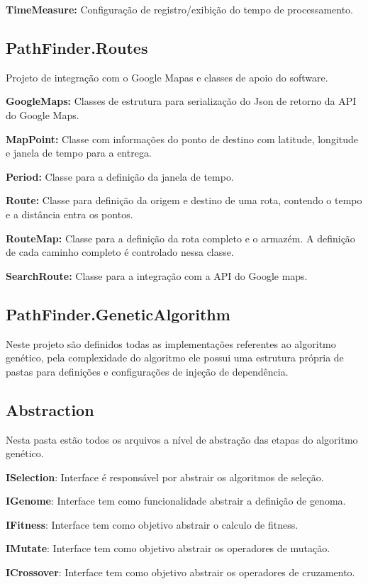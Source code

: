 \textbf{TimeMeasure:} Configuração de registro/exibição do tempo de processamento.
\subsection{PathFinder.Routes}

Projeto de integração com o Google Mapas e classes de apoio do software.

\textbf{GoogleMaps:} Classes de estrutura para serialização do Json de retorno da API do Google Maps.

\textbf{MapPoint:} Classe com informações do ponto de destino com latitude, longitude e janela de tempo para a entrega.

\textbf{Period:} Classe para a definição da janela de tempo.

\textbf{Route:} Classe para definição da origem e destino de uma rota, contendo o tempo e a distância entra os pontos.

\textbf{RouteMap:} Classe para a definição da rota completo e o armazém. A definição de cada caminho completo é controlado nessa classe. 

\textbf{SearchRoute:} Classe para a integração com a API do Google maps.

\subsection{PathFinder.GeneticAlgorithm}
Neste projeto são definidos todas as implementações referentes ao algoritmo genético, pela complexidade do algoritmo ele possui uma estrutura própria de pastas para definições e configurações de injeção de dependência.

\subsection{Abstraction}

Nesta pasta estão todos os arquivos a nível de abstração das etapas do algoritmo genético.

\textbf{ISelection}: Interface é responsável por abstrair os algoritmos de seleção.

\textbf{IGenome}: Interface tem como funcionalidade abstrair a definição de genoma.

\textbf{IFitness}: Interface tem como objetivo abstrair o calculo de fitness.

\textbf{IMutate}: Interface tem como objetivo abstrair os operadores de mutação.

\textbf{ICrossover}:  Interface tem como objetivo abstrair os operadores de cruzamento.

